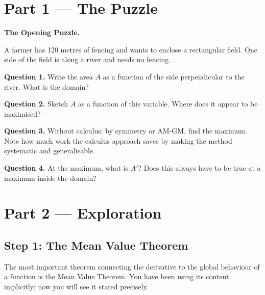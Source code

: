 \documentclass[12pt, a4paper]{article}
\begin{document}
\newpage

\section{Part 1 \texorpdfstring{---}{--} The Puzzle}

\begin{puzzlebox}
\textbf{The Opening Puzzle.}

A farmer has 120 metres of fencing and wants to enclose a rectangular field. One side of the field is along a river and needs no fencing.

\medskip
\textbf{Question 1.} Write the area $A$ as a function of the side perpendicular to the river. What is the domain?

\textbf{Question 2.} Sketch $A$ as a function of this variable. Where does it appear to be maximised?

\textbf{Question 3.} Without calculus: by symmetry or AM-GM, find the maximum. Note how much work the calculus approach saves by making the method systematic and generalisable.

\textbf{Question 4.} At the maximum, what is $A'$? Does this always have to be true at a maximum inside the domain?
\end{puzzlebox}

\section{Part 2 \texorpdfstring{---}{--} Exploration}

\subsection{Step 1: The Mean Value Theorem}

The most important theorem connecting the derivative to the global behaviour of a function is the Mean Value Theorem. You have been using its content implicitly; now you will see it stated precisely.
\end{document}
